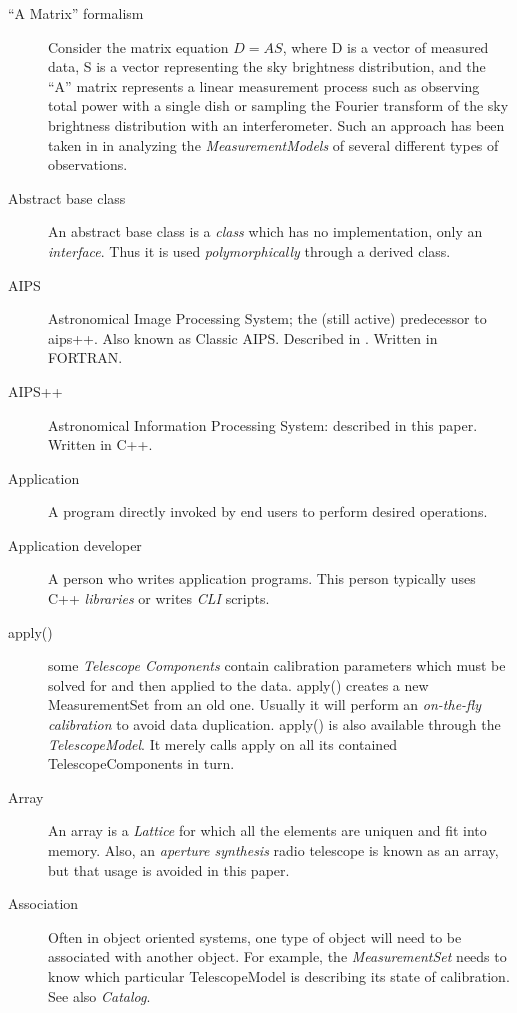 \begin{description}

\item[``A Matrix'' formalism] Consider the matrix equation $D = A S$,
where D is a vector of measured data, S is a vector representing the
sky brightness distribution, and the ``A'' matrix represents a linear
measurement process such as observing total power with a single dish
or sampling the Fourier transform of the sky brightness distribution
with an interferometer.  Such an approach has been taken in
\cite{cornwell:imaging,cornwell:telescope} in analyzing the
{\em MeasurementModels} of several different types of observations.

\item[Abstract base class] An abstract base class is a {\em class}
which has no implementation, only an {\em interface}. Thus it is used
{\em polymorphically} through a derived class.

\item[AIPS] Astronomical Image Processing System; the (still active)
predecessor to {\sc aips++}. Also known as Classic AIPS. Described in
\cite{bg:AIPS}. Written in FORTRAN.

\item[AIPS++] Astronomical Information Processing System: described in
this paper. Written in C++.

\item[Application] A program directly invoked by end users to perform
desired operations.

\item[Application developer] A person who writes {application}
programs. This person typically uses C++ {\em libraries} or writes
{\em CLI} scripts.

\item[apply()] some {\em Telescope Components} contain calibration
parameters which must be solved for and then applied to the data.
apply() creates a new MeasurementSet from an old one. Usually it will
perform an {\em on-the-fly calibration} to avoid data duplication.
apply() is also available through the {\em TelescopeModel}. It merely
calls apply on all its contained TelescopeComponents in turn.

\item[Array]
An array is a {\em Lattice} for which all the elements are uniquen and
fit into memory. Also, an {\em aperture synthesis} radio telescope is
known as an array, but that usage is avoided in this paper.

\item[Association] Often in object oriented systems, one type of
object will need to be associated with another object.  For example,
the {\em MeasurementSet} needs to know which particular TelescopeModel
is describing its state of calibration.  See also {\em Catalog}.


\end{description}
